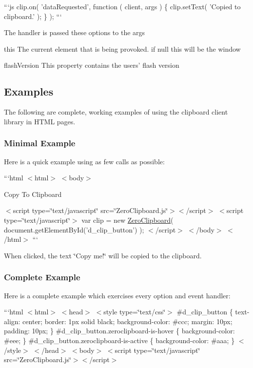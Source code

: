```js clip.\-on( 'data\-Requested', function ( client, args ) \{ clip.\-set\-Text( 'Copied to clipboard.' ); \} ); ```

The handler is passed these options to the {\ttfamily args}


\begin{DoxyDescription}
\item[this ]The current element that is being provoked. if null this will be the window 
\item[flash\-Version ]This property contains the users' flash version 
\end{DoxyDescription}

\subsection*{Examples}

The following are complete, working examples of using the clipboard client library in H\-T\-M\-L pages.

\subsubsection*{Minimal Example}

Here is a quick example using as few calls as possible\-:

```html $<$html$>$ $<$body$>$

Copy To Clipboard

$<$script type=\char`\"{}text/javascript\char`\"{} src=\char`\"{}\-Zero\-Clipboard.\-js\char`\"{}$>$$<$/script$>$ $<$script type=\char`\"{}text/javascript\char`\"{}$>$ var clip = new \hyperlink{class_zero_clipboard}{Zero\-Clipboard}( document.\-get\-Element\-By\-Id('d\-\_\-clip\-\_\-button') ); $<$/script$>$ $<$/body$>$ $<$/html$>$ ```

When clicked, the text \char`\"{}\-Copy me!\char`\"{} will be copied to the clipboard.

\subsubsection*{Complete Example}

Here is a complete example which exercises every option and event handler\-:

```html $<$html$>$ $<$head$>$ $<$style type=\char`\"{}text/css\char`\"{}$>$ \#d\-\_\-clip\-\_\-button \{ text-\/align\-: center; border\-: 1px solid black; background-\/color\-: \#ccc; margin\-: 10px; padding\-: 10px; \} \#d\-\_\-clip\-\_\-button.\-zeroclipboard-\/is-\/hover \{ background-\/color\-: \#eee; \} \#d\-\_\-clip\-\_\-button.\-zeroclipboard-\/is-\/active \{ background-\/color\-: \#aaa; \} $<$/style$>$ $<$/head$>$ $<$body$>$ $<$script type=\char`\"{}text/javascript\char`\"{} src=\char`\"{}\-Zero\-Clipboard.\-js\char`\"{}$>$$<$/script$>$

